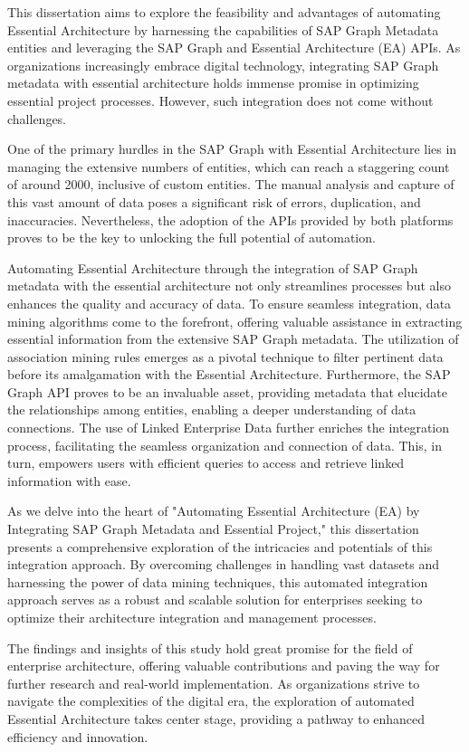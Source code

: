 \documentclass{article}
\begin{document}
This dissertation aims to explore the feasibility and advantages of automating Essential Architecture by harnessing the capabilities of SAP Graph Metadata entities and leveraging the SAP Graph and Essential Architecture (EA) APIs. As organizations increasingly embrace digital technology, integrating SAP Graph metadata with essential architecture holds immense promise in optimizing essential project processes. However, such integration does not come without challenges.

One of the primary hurdles in the SAP Graph with Essential Architecture lies in managing the extensive numbers of entities, which can reach a staggering count of around 2000, inclusive of custom entities. The manual analysis and capture of this vast amount of data poses a significant risk of errors, duplication, and inaccuracies. Nevertheless, the adoption of the APIs provided by both platforms proves to be the key to unlocking the full potential of automation.

Automating Essential Architecture through the integration of SAP Graph metadata with the essential architecture not only streamlines processes but also enhances the quality and accuracy of data. To ensure seamless integration, data mining algorithms come to the forefront, offering valuable assistance in extracting essential information from the extensive SAP Graph metadata. The utilization of association mining rules emerges as a pivotal technique to filter pertinent data before its amalgamation with the Essential Architecture. Furthermore, the SAP Graph API proves to be an invaluable asset, providing metadata that elucidate the relationships among entities, enabling a deeper understanding of data connections. The use of Linked Enterprise Data further enriches the integration process, facilitating the seamless organization and connection of data. This, in turn, empowers users with efficient queries to access and retrieve linked information with ease.

As we delve into the heart of "Automating Essential Architecture (EA) by Integrating SAP Graph Metadata and Essential Project," this dissertation presents a comprehensive exploration of the intricacies and potentials of this integration approach. By overcoming challenges in handling vast datasets and harnessing the power of data mining techniques, this automated integration approach serves as a robust and scalable solution for enterprises seeking to optimize their architecture integration and management processes.

The findings and insights of this study hold great promise for the field of enterprise architecture, offering valuable contributions and paving the way for further research and real-world implementation. As organizations strive to navigate the complexities of the digital era, the exploration of automated Essential Architecture takes center stage, providing a pathway to enhanced efficiency and innovation.
\end{document}
